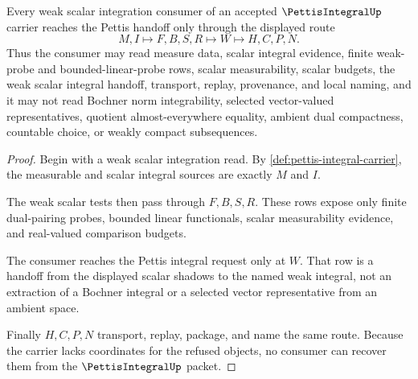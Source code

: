 \begin{theorem}
\label{thm:pettis-integral-weak-scalar-handoff}
Every weak scalar integration consumer of an accepted $\PettisIntegralUp$ carrier reaches the Pettis handoff only through the displayed route
$$
M,I \longmapsto F,B,S,R \longmapsto W \longmapsto H,C,P,N .
$$
Thus the consumer may read measure data, scalar integral evidence, finite weak-probe and bounded-linear-probe rows, scalar measurability, scalar budgets, the weak scalar integral handoff, transport, replay, provenance, and local naming, and it may not read Bochner norm integrability, selected vector-valued representatives, quotient almost-everywhere equality, ambient dual compactness, countable choice, or weakly compact subsequences.
\end{theorem}
\begin{proof}
Begin with a weak scalar integration read. By \autoref{def:pettis-integral-carrier}, the measurable and scalar integral sources are exactly $M$ and $I$.

The weak scalar tests then pass through $F,B,S,R$. These rows expose only finite dual-pairing probes, bounded linear functionals, scalar measurability evidence, and real-valued comparison budgets.

The consumer reaches the Pettis integral request only at $W$. That row is a handoff from the displayed scalar shadows to the named weak integral, not an extraction of a Bochner integral or a selected vector representative from an ambient space.

Finally $H,C,P,N$ transport, replay, package, and name the same route. Because the carrier lacks coordinates for the refused objects, no consumer can recover them from the $\PettisIntegralUp$ packet.
\end{proof}



